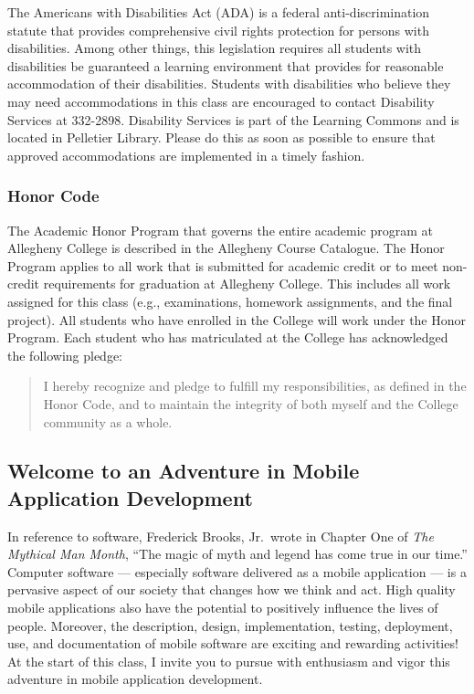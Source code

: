 The Americans with Disabilities Act (ADA) is a federal anti-discrimination statute that provides comprehensive civil
rights protection for persons with disabilities.  Among other things, this legislation requires all students with
disabilities be guaranteed a learning environment that provides for reasonable accommodation of their disabilities.
Students with disabilities who believe they may need accommodations in this class are encouraged to contact Disability
Services at 332-2898.  Disability Services is part of the Learning Commons and is located in Pelletier Library.
Please do this as soon as possible to ensure that approved accommodations are implemented in a timely fashion.

\subsubsection*{Honor Code}

The Academic Honor Program that governs the entire academic program at Allegheny College is described in the Allegheny
Course Catalogue.  The Honor Program applies to all work that is submitted for academic credit or to meet non-credit
requirements for graduation at Allegheny College.  This includes all work assigned for this class (e.g., examinations,
homework assignments, and the final project).  All students who have enrolled in the College will work under the Honor
Program.  Each student who has matriculated at the College has acknowledged the following pledge:

\vspace*{-.1in}
\begin{quote}
I hereby recognize and pledge to fulfill my responsibilities, as defined in the Honor Code, and to maintain the
integrity of both myself and the College community as a whole.  
\end{quote}
\vspace*{-.15in}

\subsection*{Welcome to an Adventure in Mobile Application Development}

In reference to software, Frederick Brooks, Jr.\ wrote in Chapter One of {\em The Mythical Man Month}, ``The magic of
myth and legend has come true in our time.'' Computer software --- especially software delivered as a mobile application
--- is a pervasive aspect of our society that changes how we think and act.  High quality mobile applications also have
the potential to positively influence the lives of people. Moreover, the description, design, implementation, testing,
deployment, use, and documentation of mobile software are exciting and rewarding activities!  At the start of this class, I
invite you to pursue with enthusiasm and vigor this adventure in mobile application development.


